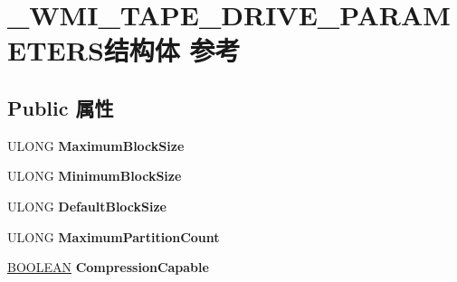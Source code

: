 \hypertarget{struct___w_m_i___t_a_p_e___d_r_i_v_e___p_a_r_a_m_e_t_e_r_s}{}\section{\+\_\+\+W\+M\+I\+\_\+\+T\+A\+P\+E\+\_\+\+D\+R\+I\+V\+E\+\_\+\+P\+A\+R\+A\+M\+E\+T\+E\+R\+S结构体 参考}
\label{struct___w_m_i___t_a_p_e___d_r_i_v_e___p_a_r_a_m_e_t_e_r_s}
\subsection*{Public 属性}
\begin{DoxyCompactItemize}
\item 
\mbox{\label{struct___w_m_i___t_a_p_e___d_r_i_v_e___p_a_r_a_m_e_t_e_r_s_a9f148bdf943b79660b6cfc4f58e7db16}} 
U\+L\+O\+NG {\bfseries Maximum\+Block\+Size}
\item 
\mbox{\label{struct___w_m_i___t_a_p_e___d_r_i_v_e___p_a_r_a_m_e_t_e_r_s_ab73db35e8df1f4c6c7ebbafb5ca5cde7}} 
U\+L\+O\+NG {\bfseries Minimum\+Block\+Size}
\item 
\mbox{\label{struct___w_m_i___t_a_p_e___d_r_i_v_e___p_a_r_a_m_e_t_e_r_s_a377e02e1a85859b061667959730a8a39}} 
U\+L\+O\+NG {\bfseries Default\+Block\+Size}
\item 
\mbox{\label{struct___w_m_i___t_a_p_e___d_r_i_v_e___p_a_r_a_m_e_t_e_r_s_a581eb3f10c967daf21fe453bd5f44931}} 
U\+L\+O\+NG {\bfseries Maximum\+Partition\+Count}
\item 
\mbox{\label{struct___w_m_i___t_a_p_e___d_r_i_v_e___p_a_r_a_m_e_t_e_r_s_aa7adbfcf4da0f8eb191605ad9eb4e629}} 
\hyperlink{_processor_bind_8h_a112e3146cb38b6ee95e64d85842e380a}{B\+O\+O\+L\+E\+AN} {\bfseries Compression\+Capable}
\item 
\mbox{\label{struct___w_m_i___t_a_p_e___d_r_i_v_e___p_a_r_a_m_e_t_e_r_s_a6e79806778d18c292aa349bf37996dca}} 

\end{DoxyCompactItemize}
